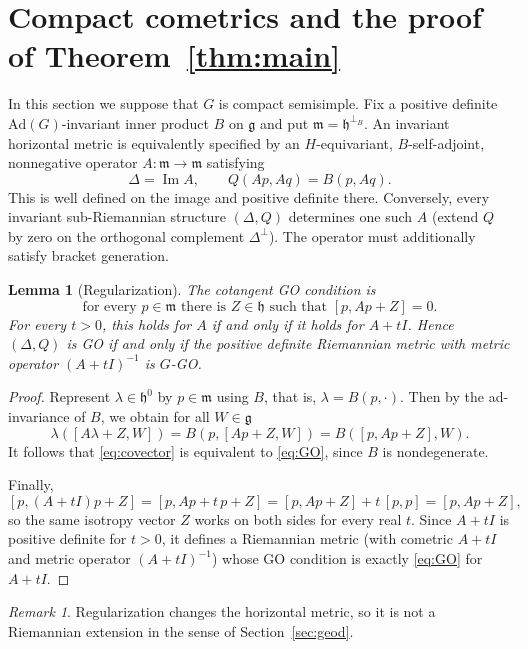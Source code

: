 \documentclass[12pt]{amsart}
\theoremstyle{plain}
\newtheorem{lemma}[theorem]{Lemma}
\theoremstyle{definition}
\theoremstyle{remark}
\newtheorem{remark}[theorem]{Remark}
\newcommand{\alg}[1]{\mathfrak{#1}}
\newcommand{\imd}{\operatorname{Im}}
\begin{document}
\section{Compact cometrics and the proof of Theorem~\ref{thm:main}}\label{sec:compact}

In this section we suppose that $G$ is compact semisimple. Fix a positive definite
$\mathrm{Ad}(G)$-invariant inner product $B$ on $\alg{g}$ and put $\alg{m}=\alg{h}^{\perp_B}$. An
invariant horizontal metric is equivalently specified by an $H$-equivariant, $B$-self-adjoint,
nonnegative operator $A:\alg{m}\to\alg{m}$ satisfying
\[ \Delta=\imd A,\qquad Q(Ap,Aq)=B(p,Aq). \]
This is well defined on the image and positive definite there. Conversely, every
invariant sub-Riemannian structure $(\Delta,Q)$ determines one such $A$ (extend $Q$ by zero on the
orthogonal complement $\Delta^{\perp}$). The operator must additionally satisfy bracket generation.

\begin{lemma}[Regularization]\label{lem:reg}
The cotangent GO condition is
\begin{equation}\label{eq:GO}
\text{for every }p\in\alg{m}\text{ there is }Z\in\alg{h}\text{ such that }[p,Ap+Z]=0.
\end{equation}
For every $t>0$, this holds for $A$ if and only if it holds for $A+tI$. Hence $(\Delta,Q)$ is GO
if and only if the positive definite Riemannian metric with metric operator $(A+tI)^{-1}$ is
$G$-GO.
\end{lemma}

\begin{proof}
Represent $\lambda\in\alg{h}^0$ by $p\in\alg{m}$ using $B$, that is, $\lambda=B(p,\cdot)$. Then
by the ad-invariance of $B$, we obtain for all $W\in\alg{g}$
\[ \lambda([A\lambda+Z,W])=B(p,[Ap+Z,W])=B([p,Ap+Z],W).\]
It follows that  \eqref{eq:covector} is equivalent to \eqref{eq:GO}, since $B$ is nondegenerate.

Finally,
\[ [p,(A+tI)p+Z]=[p,Ap+t\,p+Z]=[p,Ap+Z]+t\,[p,p]=[p,Ap+Z], \]
so the same isotropy vector $Z$ works on both sides for every real $t$. Since $A+tI$ is positive
definite for $t>0$, it defines a Riemannian metric (with cometric $A+tI$ and metric operator
$(A+tI)^{-1}$) whose GO condition is exactly \eqref{eq:GO} for $A+tI$.
\end{proof}

\begin{remark}\label{rem:reg}
Regularization changes the horizontal metric, so it is not a Riemannian extension in the sense of
Section~\ref{sec:geod}.
\end{remark}
\end{document}

